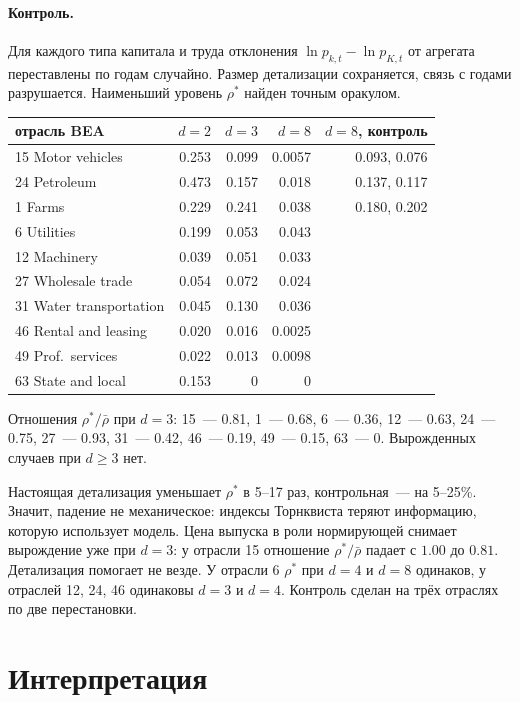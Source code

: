 \documentclass[a4paper,11pt]{article}
\theoremstyle{plain}
\theoremstyle{definition}
\theoremstyle{remark}
\begin{document}
\paragraph{Контроль.} Для каждого типа капитала и труда отклонения $\ln p_{k,t}-\ln p_{K,t}$ от агрегата переставлены по годам случайно. Размер детализации сохраняется, связь с годами разрушается. Наименьший уровень $\rho^*$ найден точным оракулом.
\begin{center}
\begin{tabular}{lrrrr}
    \toprule
    отрасль BEA & $d=2$ & $d=3$ & $d=8$ & $d=8$, контроль \\
    \midrule
    15 Motor vehicles & 0.253 & 0.099 & 0.0057 & 0.093, 0.076 \\
    24 Petroleum & 0.473 & 0.157 & 0.018 & 0.137, 0.117 \\
    1 Farms & 0.229 & 0.241 & 0.038 & 0.180, 0.202 \\
    6 Utilities & 0.199 & 0.053 & 0.043 & \\
    12 Machinery & 0.039 & 0.051 & 0.033 & \\
    27 Wholesale trade & 0.054 & 0.072 & 0.024 & \\
    31 Water transportation & 0.045 & 0.130 & 0.036 & \\
    46 Rental and leasing & 0.020 & 0.016 & 0.0025 & \\
    49 Prof.\ services & 0.022 & 0.013 & 0.0098 & \\
    63 State and local & 0.153 & 0 & 0 & \\
    \bottomrule
\end{tabular}
\end{center}
Отношения $\rho^*/\bar\rho$ при $d=3$: 15~--- 0.81, 1~--- 0.68, 6~--- 0.36, 12~--- 0.63, 24~--- 0.75, 27~--- 0.93, 31~--- 0.42, 46~--- 0.19, 49~--- 0.15, 63~--- 0. Вырожденных случаев при $d\ge3$ нет.

Настоящая детализация уменьшает $\rho^*$ в 5--17 раз, контрольная~--- на 5--25\%. Значит, падение не механическое: индексы Торнквиста теряют информацию, которую использует модель. Цена выпуска в роли нормирующей снимает вырождение уже при $d=3$: у отрасли 15 отношение $\rho^*/\bar\rho$ падает с $1.00$ до $0.81$. Детализация помогает не везде. У отрасли 6 $\rho^*$ при $d=4$ и $d=8$ одинаков, у отраслей 12, 24, 46 одинаковы $d=3$ и $d=4$. Контроль сделан на трёх отраслях по две перестановки.

\section{Интерпретация}
\end{document}
